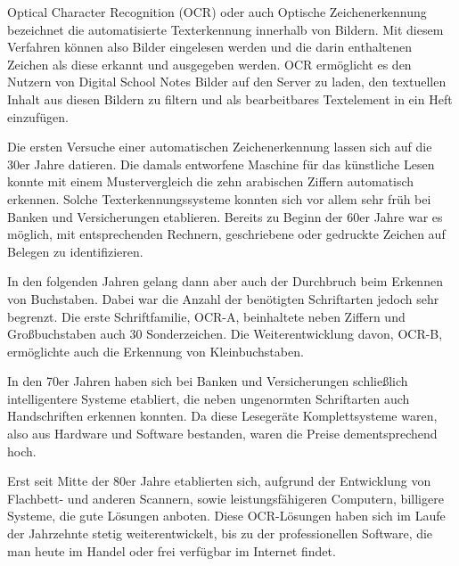
Optical Character Recognition (OCR) oder auch Optische Zeichenerkennung bezeichnet die automatisierte Texterkennung innerhalb von Bildern. Mit diesem Verfahren können also Bilder eingelesen werden und die darin enthaltenen Zeichen als diese erkannt und ausgegeben werden. OCR ermöglicht es den Nutzern von Digital School Notes Bilder auf den Server zu laden, den textuellen Inhalt aus diesen Bildern zu filtern und als bearbeitbares Textelement in ein Heft einzufügen.


Die ersten Versuche einer automatischen Zeichenerkennung lassen sich auf die 30er Jahre datieren. Die damals entworfene Maschine für das künstliche Lesen konnte mit einem Mustervergleich die zehn arabischen Ziffern automatisch erkennen. Solche Texterkennungssysteme konnten sich vor allem sehr früh bei Banken und Versicherungen etablieren. Bereits zu Beginn der 60er Jahre war es möglich, mit entsprechenden Rechnern, geschriebene oder gedruckte Zeichen auf Belegen zu identifizieren. \cite{OCRB,OCRE,OCRP}

In den folgenden Jahren gelang dann aber auch der Durchbruch beim Erkennen von Buchstaben. Dabei war die Anzahl der benötigten Schriftarten jedoch sehr begrenzt. Die erste Schriftfamilie, OCR-A, beinhaltete neben Ziffern und Großbuchstaben auch 30 Sonderzeichen. Die Weiterentwicklung davon, OCR-B, ermöglichte auch die Erkennung von Kleinbuchstaben. \cite{OCRB}

\newpage

In den 70er Jahren haben sich bei Banken und Versicherungen schließlich intelligentere Systeme etabliert, die neben ungenormten Schriftarten auch Handschriften erkennen konnten. Da diese Lesegeräte Komplettsysteme waren, also aus Hardware und Software bestanden, waren die Preise dementsprechend hoch. \cite{OCRB}

Erst seit Mitte der 80er Jahre etablierten sich, aufgrund der Entwicklung von Flachbett- und anderen Scannern, sowie leistungsfähigeren Computern, billigere Systeme, die gute Lösungen anboten. Diese OCR-Lösungen haben sich im Laufe der Jahrzehnte stetig weiterentwickelt, bis zu der professionellen Software, die man heute im Handel oder frei verfügbar im Internet findet. \cite{OCRB}

